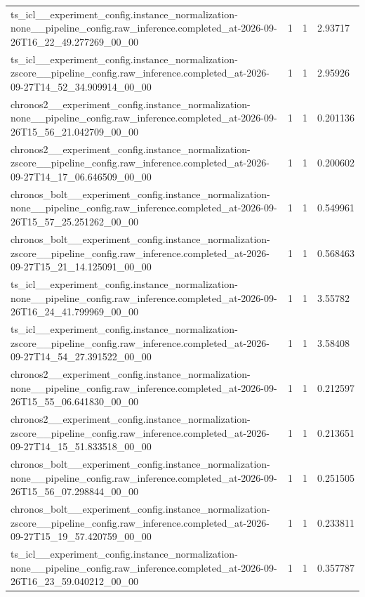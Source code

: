 \begin{tabular}{llll}
ts\_icl\_\_experiment\_config.instance\_normalization-none\_\_pipeline\_config.raw\_inference.completed\_at-2026-09-26T16\_22\_49.277269\_00\_00 & 1 & 1 & 2.93717 \\
ts\_icl\_\_experiment\_config.instance\_normalization-zscore\_\_pipeline\_config.raw\_inference.completed\_at-2026-09-27T14\_52\_34.909914\_00\_00 & 1 & 1 & 2.95926 \\
chronos2\_\_experiment\_config.instance\_normalization-none\_\_pipeline\_config.raw\_inference.completed\_at-2026-09-26T15\_56\_21.042709\_00\_00 & 1 & 1 & 0.201136 \\
chronos2\_\_experiment\_config.instance\_normalization-zscore\_\_pipeline\_config.raw\_inference.completed\_at-2026-09-27T14\_17\_06.646509\_00\_00 & 1 & 1 & 0.200602 \\
chronos\_bolt\_\_experiment\_config.instance\_normalization-none\_\_pipeline\_config.raw\_inference.completed\_at-2026-09-26T15\_57\_25.251262\_00\_00 & 1 & 1 & 0.549961 \\
chronos\_bolt\_\_experiment\_config.instance\_normalization-zscore\_\_pipeline\_config.raw\_inference.completed\_at-2026-09-27T15\_21\_14.125091\_00\_00 & 1 & 1 & 0.568463 \\
ts\_icl\_\_experiment\_config.instance\_normalization-none\_\_pipeline\_config.raw\_inference.completed\_at-2026-09-26T16\_24\_41.799969\_00\_00 & 1 & 1 & 3.55782 \\
ts\_icl\_\_experiment\_config.instance\_normalization-zscore\_\_pipeline\_config.raw\_inference.completed\_at-2026-09-27T14\_54\_27.391522\_00\_00 & 1 & 1 & 3.58408 \\
chronos2\_\_experiment\_config.instance\_normalization-none\_\_pipeline\_config.raw\_inference.completed\_at-2026-09-26T15\_55\_06.641830\_00\_00 & 1 & 1 & 0.212597 \\
chronos2\_\_experiment\_config.instance\_normalization-zscore\_\_pipeline\_config.raw\_inference.completed\_at-2026-09-27T14\_15\_51.833518\_00\_00 & 1 & 1 & 0.213651 \\
chronos\_bolt\_\_experiment\_config.instance\_normalization-none\_\_pipeline\_config.raw\_inference.completed\_at-2026-09-26T15\_56\_07.298844\_00\_00 & 1 & 1 & 0.251505 \\
chronos\_bolt\_\_experiment\_config.instance\_normalization-zscore\_\_pipeline\_config.raw\_inference.completed\_at-2026-09-27T15\_19\_57.420759\_00\_00 & 1 & 1 & 0.233811 \\
ts\_icl\_\_experiment\_config.instance\_normalization-none\_\_pipeline\_config.raw\_inference.completed\_at-2026-09-26T16\_23\_59.040212\_00\_00 & 1 & 1 & 0.357787 \\

\end{tabular}
